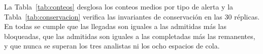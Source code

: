 La Tabla~\ref{tab:conteos} desglosa los conteos medios por tipo de alerta y la
Tabla~\ref{tab:conservacion} verifica las invariantes de conservación en las 30
réplicas. En todas se cumple que las llegadas son iguales a las admitidas más
las bloqueadas, que las admitidas son iguales a las completadas más las
remanentes, y que nunca se superan los tres analistas ni los ocho espacios de
cola.

\begin{table}[H]
\centering
\small

\caption{Conteos medios por réplica en el SOC base.}
\label{tab:conteos}
\end{table}

\begin{table}[H]
\centering
\small

\caption{Verificación de invariantes de capacidad y conservación en las 30 réplicas del SOC base.}
\label{tab:conservacion}
\end{table}
